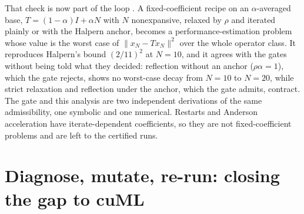 \documentclass[11pt]{article}
\begin{document}
That check is now part of the loop .
A fixed-coefficient recipe on an $\alpha$-averaged base, $T = (1-\alpha)I + \alpha N$
with $N$ nonexpansive, relaxed by $\rho$ and iterated plainly or with the
Halpern anchor, becomes a performance-estimation problem whose value is the
worst case of $\|x_N - T x_N\|^2$ over the whole operator class. It reproduces
Halpern's bound $(2/11)^2$ at $N=10$, and it agrees with the gates without being
told what they decided: reflection without an anchor ($\rho\alpha = 1$), which the
gate rejects, shows no worst-case decay from $N=10$ to $N=20$, while strict
relaxation and reflection under the anchor, which the gate admits, contract.
The gate and this analysis are two independent derivations of the same
admissibility, one symbolic and one numerical. Restarts and Anderson
acceleration have iterate-dependent coefficients, so they are not
fixed-coefficient problems and are left to the certified runs.

\section{Diagnose, mutate, re-run: closing the gap to cuML}
\label{app:log:diagnose}
\end{document}
